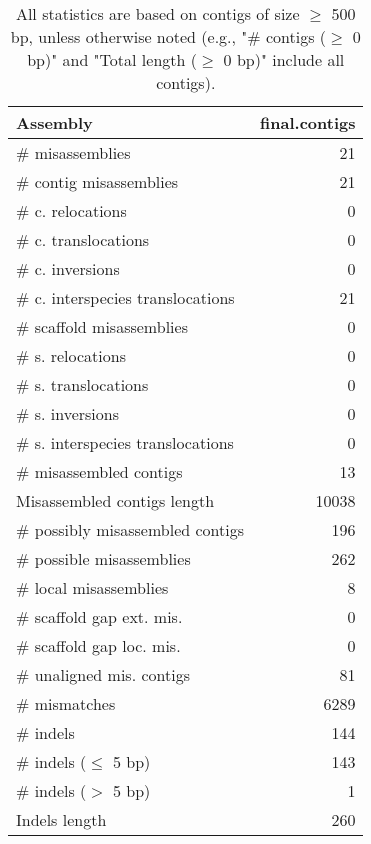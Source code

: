 \documentclass[12pt,a4paper]{article}
\begin{document}
\begin{table}[ht]
\begin{center}
\caption{All statistics are based on contigs of size $\geq$ 500 bp, unless otherwise noted (e.g., "\# contigs ($\geq$ 0 bp)" and "Total length ($\geq$ 0 bp)" include all contigs).}
\begin{tabular}{|l*{1}{|r}|}
\hline
Assembly & final.contigs \\ \hline
\# misassemblies & 21 \\ \hline
\hspace{2mm}\# contig misassemblies & 21 \\ \hline
\hspace{5mm}\# c. relocations & 0 \\ \hline
\hspace{5mm}\# c. translocations & 0 \\ \hline
\hspace{5mm}\# c. inversions & 0 \\ \hline
\hspace{5mm}\# c. interspecies translocations & 21 \\ \hline
\hspace{2mm}\# scaffold misassemblies & 0 \\ \hline
\hspace{5mm}\# s. relocations & 0 \\ \hline
\hspace{5mm}\# s. translocations & 0 \\ \hline
\hspace{5mm}\# s. inversions & 0 \\ \hline
\hspace{5mm}\# s. interspecies translocations & 0 \\ \hline
\# misassembled contigs & 13 \\ \hline
Misassembled contigs length & 10038 \\ \hline
\# possibly misassembled contigs & 196 \\ \hline
\hspace{5mm}\# possible misassemblies & 262 \\ \hline
\# local misassemblies & 8 \\ \hline
\# scaffold gap ext. mis. & 0 \\ \hline
\# scaffold gap loc. mis. & 0 \\ \hline
\# unaligned mis. contigs & 81 \\ \hline
\# mismatches & 6289 \\ \hline
\# indels & 144 \\ \hline
\hspace{5mm}\# indels ($\leq$ 5 bp) & 143 \\ \hline
\hspace{5mm}\# indels ($>$ 5 bp) & 1 \\ \hline
Indels length & 260 \\ \hline
\end{tabular}
\end{center}
\end{table}
\end{document}
